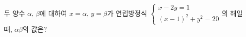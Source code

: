 두 양수 $\alpha$, $\beta$에 대하여 $x=\alpha$, $y=\beta$가 연립방정식 $\begin{cases} x-2y=1 \\ (x-1)^2+y^2=20 \end{cases}$의 해일 때, $\alpha\beta$의 값은?
